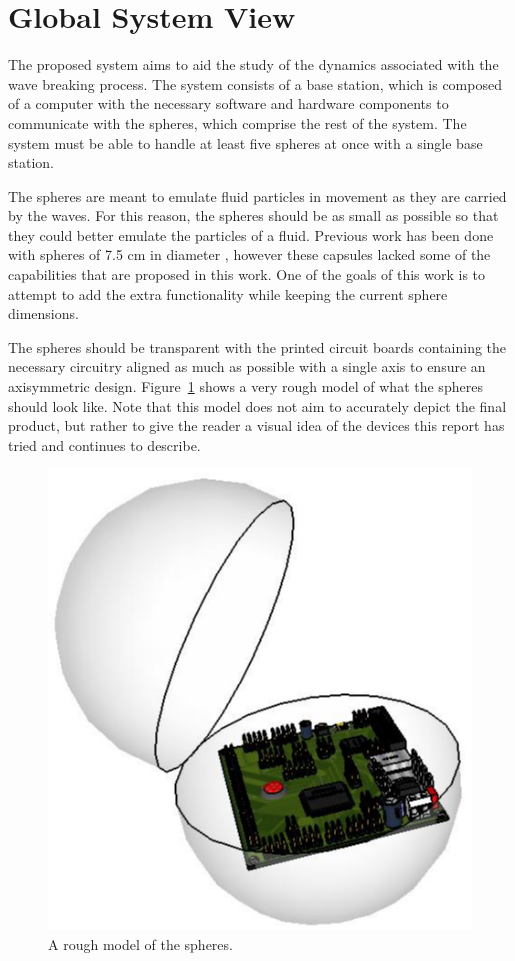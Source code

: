 \section{Global System View}

The proposed system aims to aid the study of the dynamics associated with the wave breaking process.  The system consists of a base station, which is composed of a computer with the necessary software and hardware components to communicate with the spheres, which comprise the rest of the system.  The system must be able to handle at least five spheres at once with a single base station.

The spheres are meant to emulate fluid particles in movement as they are carried by the waves.  For this reason, the spheres should be as small as possible so that they could better emulate the particles of a fluid.  Previous work has been done with spheres of 7.5 cm in diameter \cite{Canals2012}, however these capsules lacked some of the capabilities that are proposed in this work.  One of the goals of this work is to attempt to add the extra functionality while keeping the current sphere dimensions.

The spheres should be transparent with the printed circuit boards containing the necessary circuitry aligned as much as possible with a single axis to ensure an axisymmetric design.  Figure~\ref{fig:sphereMockup} shows a very rough model of what the spheres should look like.  Note that this model does not aim to accurately depict the final product, but rather to give the reader a visual idea of the devices this report has tried and continues to describe.  

\begin{figure}[H]
	\centering
	\includegraphics[scale=0.6]{img/Sphere_001.png}
	\caption{A rough model of the spheres. \label{fig:sphereMockup}}
\end{figure}

